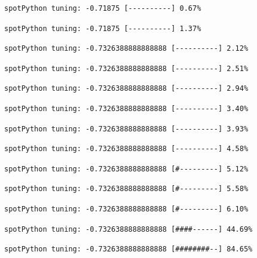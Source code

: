 \documentclass[
  letterpaper,
  DIV=11,
  numbers=noendperiod]{scrreprt}
\begin{document}
\begin{verbatim}
spotPython tuning: -0.71875 [----------] 0.67% 
\end{verbatim}

\begin{verbatim}
spotPython tuning: -0.71875 [----------] 1.37% 
\end{verbatim}

\begin{verbatim}
spotPython tuning: -0.7326388888888888 [----------] 2.12% 
\end{verbatim}

\begin{verbatim}
spotPython tuning: -0.7326388888888888 [----------] 2.51% 
\end{verbatim}

\begin{verbatim}
spotPython tuning: -0.7326388888888888 [----------] 2.94% 
\end{verbatim}

\begin{verbatim}
spotPython tuning: -0.7326388888888888 [----------] 3.40% 
\end{verbatim}

\begin{verbatim}
spotPython tuning: -0.7326388888888888 [----------] 3.93% 
\end{verbatim}

\begin{verbatim}
spotPython tuning: -0.7326388888888888 [----------] 4.58% 
\end{verbatim}

\begin{verbatim}
spotPython tuning: -0.7326388888888888 [#---------] 5.12% 
\end{verbatim}

\begin{verbatim}
spotPython tuning: -0.7326388888888888 [#---------] 5.58% 
\end{verbatim}

\begin{verbatim}
spotPython tuning: -0.7326388888888888 [#---------] 6.10% 
\end{verbatim}

\begin{verbatim}
spotPython tuning: -0.7326388888888888 [####------] 44.69% 
\end{verbatim}

\begin{verbatim}
spotPython tuning: -0.7326388888888888 [########--] 84.65% 
\end{verbatim}
\end{document}
